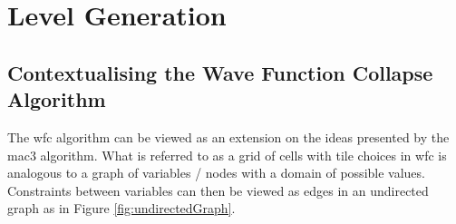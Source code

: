 



\section{Level Generation}
\subsection{Contextualising the Wave Function Collapse Algorithm}
The \acrfull{wfc} algorithm can be viewed as an extension on the ideas presented by the \acrfull{mac3} algorithm. What is referred to as a grid of cells with tile choices in \acrlong{wfc} is analogous to a graph of variables / nodes with a domain of possible values. Constraints between variables can then be viewed as edges in an undirected graph as in Figure \ref{fig:undirectedGraph}.


